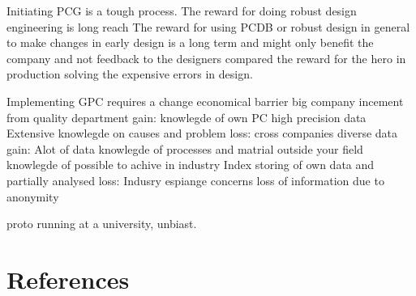 \documentclass[aip,amsmath, reprint, author-year]{revtex4-1}
\begin{document}
Initiating PCG is a tough process. 
The reward for doing robust design engineering is long reach
The reward for using PCDB or robust design in general to make changes in early design is a long term and might only benefit the company and not feedback to the designers compared the reward for the hero in production solving the expensive errors in design.

Implementing GPC requires a change
	economical barrier
		big company
			incement from quality department
			gain: 	knowlegde of own PC
					high precision data
					Extensive knowlegde on causes and problem
			loss:
		cross companies
			diverse data
			gain:		Alot of data
					knowlegde of processes and matrial outside your field
					knowlegde of possible to achive in industry
					Index storing of own data and partially analysed
			loss:		Indusry espiange concerns
					loss of information due to anonymity

proto running at a university, unbiast.


\section*{References}

\end{document}
